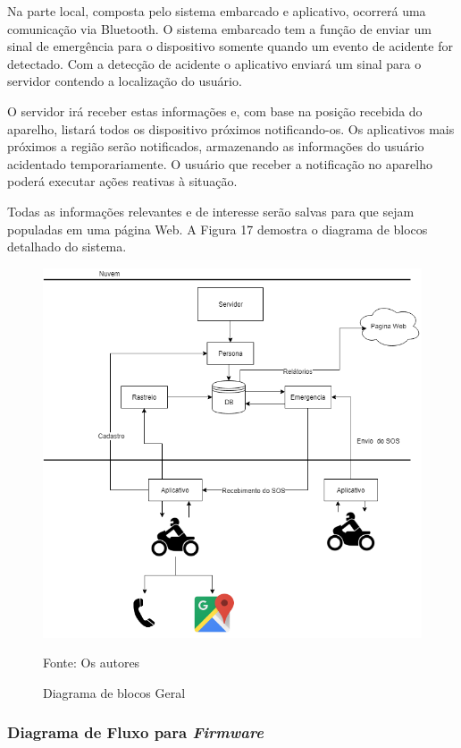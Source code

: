 Na parte local, composta pelo sistema embarcado e aplicativo, ocorrerá uma comunicação via Bluetooth. O sistema embarcado tem a função de enviar um sinal de emergência para o dispositivo somente quando um evento de acidente for detectado. Com a detecção de acidente o aplicativo enviará um sinal para o servidor contendo a localização do usuário.

O servidor irá receber estas informações e, com base na posição recebida do aparelho, listará todos os dispositivo próximos notificando-os.
Os aplicativos mais próximos a região serão notificados, armazenando as informações do usuário acidentado temporariamente. O usuário que receber a notificação no aparelho poderá executar ações reativas à situação.

Todas as informações relevantes e de interesse serão salvas para que sejam populadas em uma página Web. A Figura 17 demostra o diagrama de blocos detalhado do sistema.


\begin{figure}[H]
 
    \caption{Diagrama de blocos Geral}
    \begin{center}
    \includegraphics[width=120mm]{images/Cap1/tcc.png}
    \end{center}
       Fonte: Os autores
\end{figure}

  


\subsubsection{Diagrama de Fluxo para \textit{Firmware}}

